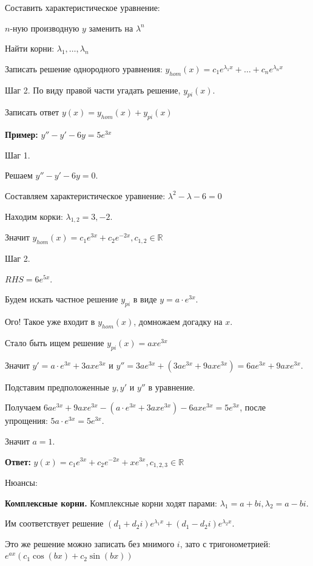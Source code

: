 \documentclass[10pt,a4paper]{article}
\begin{document}
\par Составить характеристическое уравнение:
\par $n$-ную производную $y$ заменить на $\lambda^n$
\par Найти корни: $\lambda_1, \dots, \lambda_n$
\par Записать решение однородного уравнения: $y_{hom}(x) = c_1e^{\lambda_1x} + \dots + c_ne^{\lambda_nx}$
\par Шаг 2. По виду правой части угадать решение, $y_{pi}(x).$
\par Записать ответ $y(x) = y_{hom}(x) + y_{pi}(x)$
\par \textbf{Пример:} $y'' - y' - 6y = 5e^{3x}$
\par Шаг 1.
\par Решаем $y'' - y' - 6y = 0$.
\par Составляем характеристическое уравнение: $\lambda^2 - \lambda - 6 = 0$
\par Находим корки: $\lambda_{1,2} = 3, -2$.
\par Значит $y_{hom}(x) = c_1e^{3x} + c_2e^{-2x}, c_{1,2} \in \mathbb{R}$
\par Шаг 2.
\par $RHS = 6e^{5x}.$ 
\par Будем искать частное решение $y_{pi}$ в виде $y = a \cdot e^{3x}$. 
\par Ого! Такое уже входит в $y_{hom}(x)$, домножаем догадку на $x$.
\par Стало быть ищем решение $y_{pi}(x) = axe^{3x}$
\par Значит $y' = a \cdot e^{3x} + 3axe^{3x}$ и $y'' = 3ae^{3x} + (3ae^{3x}+ 9axe^{3x}) = 6ae^{3x} + 9axe^{3x}$.
\par Подставим предположенные $y, y'$ и $y''$ в уравнение.
\par Получаем $6ae^{3x} + 9axe^{3x} - (a \cdot e^{3x} + 3axe^{3x}) - 6axe^{3x}  = 5e^{3x}$, после упрощения: $5a \cdot e^{3x} = 5e^{3x}$.
\par Значит $a = 1.$ 
\par \textbf{Ответ:} $y(x) = c_1e^{3x} + c_2e^{-2x} + xe^{3x}, c_{1, 2, 3} \in \mathbb{R}$ \\
\par Нюансы: 
\par \textbf{Комплексные корни.} Комплексные корни ходят парами: $\lambda_1 = a+ bi, \lambda_2 = a - bi$.
\par Им соответствует решение $(d_1 + d_2i)e^{\lambda_1 x} + (d_1 - d_2i)e^{\lambda_2 x}$.
\par Это же решение можно записать без мнимого $i$, зато с тригонометрией: $e^{ax}(c_1\cos(bx) + c_2\sin(bx))$
\end{document}
